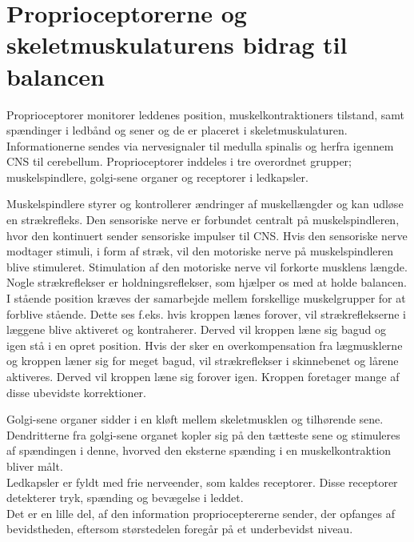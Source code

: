 \section{Proprioceptorerne og skeletmuskulaturens bidrag til balancen}
Proprioceptorer monitorer leddenes position, muskelkontraktioners tilstand, samt spændinger i ledbånd og sener og de er placeret i skeletmuskulaturen. Informationerne sendes via nervesignaler til medulla spinalis og herfra igennem CNS til cerebellum. Proprioceptorer inddeles i tre overordnet grupper; muskelspindlere, golgi-sene organer og receptorer i ledkapsler. \cite{Martini2012}

Muskelspindlere styrer og kontrollerer ændringer af muskellængder og kan udløse en strækrefleks. Den sensoriske nerve er forbundet centralt på muskelspindleren, hvor den kontinuert sender sensoriske impulser til CNS. Hvis den sensoriske nerve modtager stimuli, i form af stræk, vil den motoriske nerve på muskelspindleren blive stimuleret. Stimulation af den motoriske nerve vil forkorte musklens længde. Nogle strækreflekser er holdningsreflekser, som hjælper os med at holde balancen. I stående position kræves der samarbejde mellem forskellige muskelgrupper for at forblive stående. Dette ses f.eks. hvis kroppen lænes forover, vil strækreflekserne i læggene blive aktiveret og kontraherer. Derved vil kroppen læne sig bagud og igen stå i en opret position. Hvis der sker en overkompensation fra lægmusklerne og kroppen læner sig for meget bagud, vil strækreflekser i skinnebenet og lårene aktiveres. Derved vil kroppen læne sig forover igen. Kroppen foretager mange af disse ubevidste korrektioner. \cite{Martini2012}   %

Golgi-sene organer sidder i en kløft mellem skeletmusklen og tilhørende sene. Dendritterne fra golgi-sene organet kopler sig på den tætteste sene og stimuleres af spændingen i denne, hvorved den eksterne spænding i en muskelkontraktion bliver målt. \cite{Martini2012}    \\
Ledkapsler er fyldt med frie nerveender, som kaldes receptorer. Disse receptorer detekterer tryk, spænding og bevægelse i leddet. \cite{Martini2012}    \\
Det er en lille del, af den information proprioceptererne sender, der opfanges af bevidstheden, eftersom størstedelen foregår på et underbevidst niveau. \cite{Martini2012} \\



